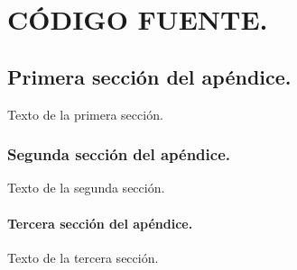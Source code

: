 
\chapter{CÓDIGO FUENTE.} 
\section{Primera sección del apéndice.}
Texto de la primera sección.
\subsection{Segunda sección del apéndice.}
Texto de la segunda sección.
\subsubsection{Tercera sección del apéndice.}
Texto de la tercera sección.
